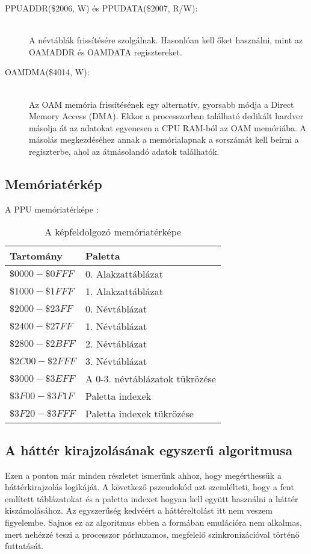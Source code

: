 \begin{description}
	\item[PPUADDR(\$2006, W) és PPUDATA(\$2007, R/W):] \hfill \\
	A névtáblák frissítésére szolgálnak. Hasonlóan kell őket használni, mint az OAMADDR és OAMDATA regisztereket.
	\item[OAMDMA(\$4014, W):] \hfill \\
	Az OAM memória frissítésének egy alternatív, gyorsabb módja a Direct Memory Access (DMA). Ekkor a processzorban található dedikált hardver másolja át az adatokat egyenesen a CPU RAM-ból az OAM memóriába. A másolás megkezdéséhez annak a memórialapnak a sorszámát kell beírni a regiszterbe, ahol az átmásolandó adatok találhatók.
\end{description}

\clearpage
\subsection{Memóriatérkép}

A PPU memóriatérképe \cite{ppuref}:

\begin{table}[H]
	\centering
	\begin{tabular}{ | l | l | }
		\hline
		Tartomány & Paletta \\
		\hline			
		$ \$0000 - \$0FFF $ & 0. Alakzattáblázat \\
		$ \$1000 - \$1FFF $ & 1. Alakzattáblázat \\
		$ \$2000 - \$23FF $ & 0. Névtáblázat \\
		$ \$2400 - \$27FF $ & 1. Névtáblázat \\
		$ \$2800 - \$2BFF $ & 2. Névtáblázat \\
		$ \$2C00 - \$2FFF $ & 3. Névtáblázat \\
		$ \$3000 - \$3EFF $ & A 0-3. névtáblázatok tükrözése \\
		$ \$3F00 - \$3F1F $ & Paletta indexek \\
		$ \$3F20 - \$3FFF $ & Paletta indexek tükrözése \\
		\hline
	\end{tabular}
	\caption{A képfeldolgozó memóriatérképe}
	\label{fig:ppumemmap}
\end{table}

\subsection{A háttér kirajzolásának egyszerű algoritmusa}

Ezen a ponton már minden részletet ismerünk ahhoz, hogy megérthessük a háttérkirajzolás logikáját. A következő pszeudokód azt szemlélteti, hogy a fent említett táblázatokat és a paletta indexet hogyan kell együtt használni a háttér kiszámolásához. Az egyszerűség kedvéért a háttéreltolást itt nem veszem figyelembe. Sajnos ez az algoritmus ebben a formában emulációra nem alkalmas, mert nehézzé teszi a processzor párhuzamos, megfelelő szinkronizációval történő futtatását.
\vspace{0.3cm}

